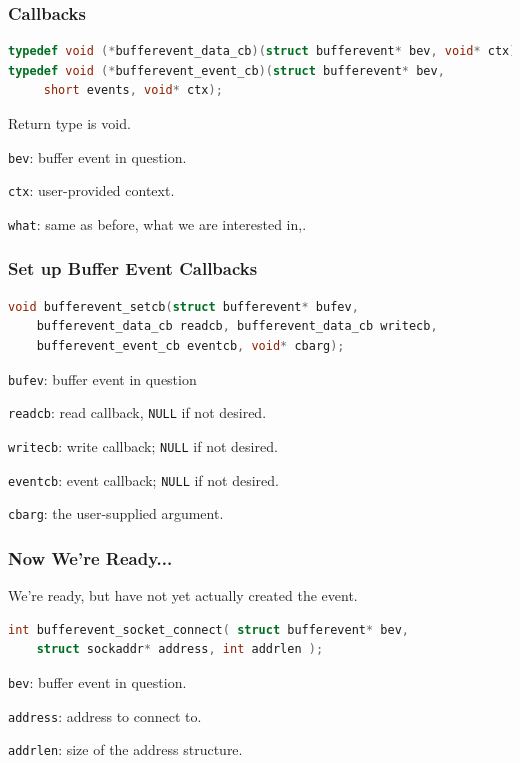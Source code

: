 \begin{frame}[fragile]
	\frametitle{Callbacks}

	\begin{lstlisting}[language=C]
typedef void (*bufferevent_data_cb)(struct bufferevent* bev, void* ctx);
typedef void (*bufferevent_event_cb)(struct bufferevent* bev, 
     short events, void* ctx);
\end{lstlisting}

	Return type is void.

	\texttt{bev}: buffer event in question.

	\texttt{ctx}: user-provided context.

	\texttt{what}: same as before, what we are interested in,.

\end{frame}


\begin{frame}[fragile]
	\frametitle{Set up Buffer Event Callbacks}

	\begin{lstlisting}[language=C]
void bufferevent_setcb(struct bufferevent* bufev, 
    bufferevent_data_cb readcb, bufferevent_data_cb writecb, 
    bufferevent_event_cb eventcb, void* cbarg);
\end{lstlisting}

	\texttt{bufev}: buffer event in question

	\texttt{readcb}: read callback, \texttt{NULL} if not desired.

	\texttt{writecb}: write callback; \texttt{NULL} if not desired.

	\texttt{eventcb}: event callback; \texttt{NULL} if not desired.

	\texttt{cbarg}: the user-supplied argument.

\end{frame}


\begin{frame}[fragile]
	\frametitle{Now We're Ready...}

	We're ready, but have not yet actually created the event.

	\begin{lstlisting}[language=C]
int bufferevent_socket_connect( struct bufferevent* bev, 
    struct sockaddr* address, int addrlen );
\end{lstlisting}

	\texttt{bev}: buffer event in question.

	\texttt{address}: address to connect to.

	\texttt{addrlen}: size of the address structure.

\end{frame}


